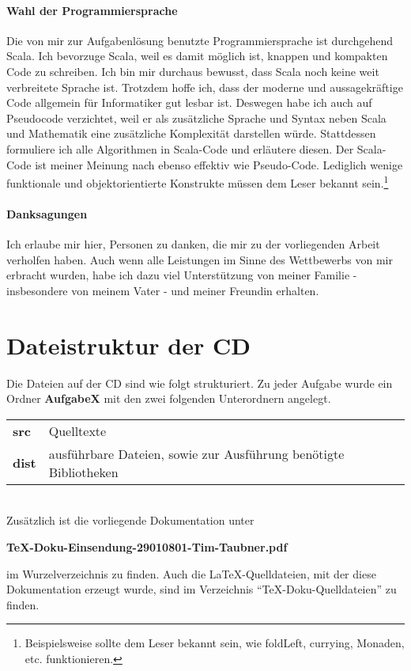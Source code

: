 \documentclass[a4paper,10pt,notitlepage]{scrreprt}
\begin{document}
\paragraph{Wahl der Programmiersprache}
 Die von mir zur Aufgabenlösung benutzte Programmiersprache ist durchgehend Scala.
 Ich bevorzuge Scala, weil es damit möglich ist, knappen und kompakten Code zu schreiben.
 Ich bin mir durchaus bewusst, dass Scala noch keine weit verbreitete Sprache ist.
 Trotzdem hoffe ich, dass der moderne und aussagekräftige Code allgemein für Informatiker gut lesbar ist.
 Deswegen habe ich auch auf Pseudocode verzichtet,
  weil er als zusätzliche Sprache und Syntax neben Scala und Mathematik eine zusätzliche Komplexität darstellen würde.
 Stattdessen formuliere ich alle Algorithmen in Scala-Code und erläutere diesen.
 Der Scala-Code ist meiner Meinung nach ebenso effektiv wie Pseudo-Code.
 Lediglich wenige funktionale und objektorientierte Konstrukte müssen dem Leser bekannt sein.\footnote{Beispielsweise
  sollte dem Leser bekannt sein, wie foldLeft, currying, Monaden, etc. funktionieren.}
\paragraph{Danksagungen}
 Ich erlaube mir hier, Personen zu danken, die mir zu der vorliegenden Arbeit verholfen haben.
 Auch wenn alle Leistungen im Sinne des Wettbewerbs von mir erbracht wurden,
  habe ich dazu viel Unterstützung von meiner Familie - insbesondere von meinem Vater - und meiner Freundin erhalten.
\section{Dateistruktur der CD}
 Die Dateien auf der CD sind wie folgt strukturiert.
 Zu jeder Aufgabe wurde ein Ordner \textbf{AufgabeX} mit den zwei folgenden Unterordnern angelegt.

 \begin{tabular}{ll}
  \textbf{src}  & Quelltexte \\
  \textbf{dist} & ausführbare Dateien, sowie zur Ausführung benötigte Bibliotheken \\
 \end{tabular}\\
 Zusätzlich ist die vorliegende Dokumentation unter
 \begin{center}\textbf{TeX-Doku-Einsendung-29010801-Tim-Taubner.pdf}\end{center}
 im Wurzelverzeichnis zu finden.
 Auch die \LaTeX-Quelldateien, mit der diese Dokumentation erzeugt wurde, sind im Verzeichnis ``TeX-Doku-Quelldateien'' zu finden.
\end{document}
